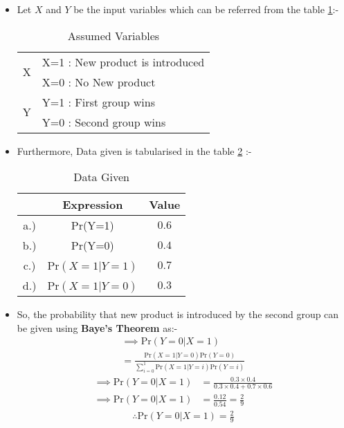 \begin{itemize}
    \item Let $X$ and $Y$ be the input variables which can be referred from the table \ref{bayes/2/8/tab:table1}:-
    \begin{table}[ht!]
    \begin{center}
    \begin{tabular}{|l|l|}
    \hline
    \multirow{2}{*}{X} & X=1 : New product is introduced \\ \cline{2-2} 
                       & X=0 : No New product \\ \hline
    \multirow{2}{*}{Y} & Y=1 :  First group wins            \\ \cline{2-2} 
                       & Y=0 : Second group wins \\ \hline
    \end{tabular}
    \end{center}
    \caption{Assumed Variables}
    \label{bayes/2/8/tab:table1}
    \end{table} 
    \item Furthermore, Data given is tabularised in the table \ref{bayes/2/8/tab:table2} :-
    \begin{table}[ht!]
    \begin{center}
    \begin{tabular}{|c|c|c|}
    \hline
     &Expression & Value \\
    \hline 
    a.)&Pr(Y=1) & $0.6$ \\ 
    \hline 
    b.)&Pr(Y=0) & $0.4$ \\ 
    \hline 
    c.)&Pr$(X=1|Y=1)$ & $0.7$ \\ 
    \hline 
    d.)&Pr$(X=1|Y=0)$ & $0.3$ \\ 
    \hline 
    \end{tabular}
    \end{center}
    \caption{Data Given}
    \label{bayes/2/8/tab:table2}
    \end{table}
    \item So, the probability that new product is introduced by the second group can be given using \textbf{Baye's Theorem} as:-
    \begin{multline}
      \implies  \text{Pr}(Y=0|X=1)
        \\
       = \frac{\text{Pr}(X=1|Y=0)\text{Pr}(Y=0)}{ \sum_{i=0}^{1}\text{Pr}(X=1|Y=i)\text{Pr}(Y=i)}
        \end{multline}
    \begin{align}
     \implies  \text{Pr}(Y=0|X=1)  &= \frac{0.3\times 0.4}{0.3\times0.4+0.7 \times 0.6 }
        \\
     \implies  \text{Pr}(Y=0|X=1) &= \frac{0.12}{0.54} =\frac{2}{9} 
    \end{align}
    \begin{align}
       \boxed{\therefore \text{Pr}(Y=0|X=1)= \frac{2}{9}}
    \end{align}
\end{itemize}